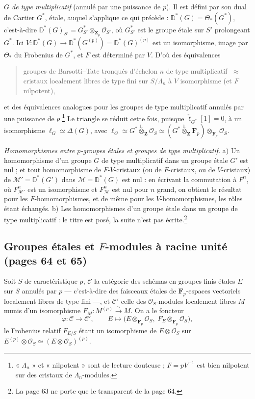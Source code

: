 \documentclass[11pt,a4paper]{article}
\begin{document}
\emph{$G$ de type multiplicatif} (annulé par une puissance de $p$). Il est
défini par son dual de Cartier $G^*$, étale, auquel s'applique ce qui
précède : $\mathbb{D}^*(G) = \Theta_*(G^*)$, c'est-à-dire
$\mathbb{D}^*(G)_{S'} = G^*_{S'} \otimes_{\mathbf{Z}_p} \mathcal{O}_{S'}$, où
$G^*_{S'}$ est le groupe étale sur $S'$ prolongeant $G^*$. Ici
$V : \mathbb{D}^*(G) \to \mathbb{D}^*(G^{(p)}) = \mathbb{D}^*(G)^{(p)}$ est un
isomorphisme, image par $\Theta_*$ du Frobenius de $G^*$, et $F$ est déterminé
par $V$. D'où des équivalences
\begin{quote}
groupes de Barsotti--Tate tronqués d'échelon $n$ de type multiplicatif
$\;\approx\;$ cristaux localement libres de type fini sur $S/\Lambda_n$ à $V$
isomorphisme (et $F$ nilpotent),
\end{quote}
et des équivalences analogues pour les groupes de type multiplicatif annulés
par une puissance de $p$.\footnote{« $\Lambda_n$ » et « nilpotent » sont de
lecture douteuse ; $F = pV^{-1}$ est bien nilpotent sur des cristaux de
$\Lambda_n$-modules.} Le triangle se réduit cette fois, puisque
$\check\ell_{G^*}[1] = 0$, à un isomorphisme $\ell_G \simeq \Delta(G)$, avec
$\ell_G \simeq G^* \overset{\mathbb{L}}{\otimes}_{\mathbf{Z}} \mathcal{O}_S
\simeq (G^* \overset{\mathbb{L}}{\otimes}_{\mathbf{Z}} \mathbf{F}_p)
\otimes_{\mathbf{F}_p} \mathcal{O}_S$.

\emph{Homomorphismes entre $p$-groupes étales et groupes de type
multiplicatif.} a) Un homomorphisme d'un groupe $G$ de type multiplicatif dans
un groupe étale $G'$ est nul ; et tout homomorphisme de $F$-$V$-cristaux (ou de
$F$-cristaux, ou de $V$-cristaux) de $\mathcal{M}' = \mathbb{D}^*(G')$ dans
$\mathcal{M} = \mathbb{D}^*(G)$ est nul : en écrivant la commutation à $F^n$,
où $F^n_{\mathcal{M}'}$ est un isomorphisme et $F^n_{\mathcal{M}}$ est nul pour
$n$ grand, on obtient le résultat pour les $F$-homomorphismes, et de même
pour les $V$-homomorphismes, les rôles étant échangés. b) Les homomorphismes
d'un groupe étale dans un groupe de type multiplicatif : le titre est posé, la
suite n'est pas écrite.\footnote{La page 63 ne porte que le transparent de la
page 64.}

\subsection*{Groupes étales et $F$-modules à racine unité (pages 64 et 65)}

Soit $S$ de caractéristique $p$, $\mathcal{C}$ la catégorie des schémas en
groupes finis étales $E$ sur $S$ annulés par $p$ — c'est-à-dire des faisceaux
étales de $\mathbf{F}_p$-espaces vectoriels localement libres de type fini —,
et $\mathcal{C}'$ celle des $\mathcal{O}_S$-modules localement libres $M$ munis
d'un isomorphisme $F_M : M^{(p)} \xrightarrow{\sim} M$. On a le foncteur
\[
  \varphi : \mathcal{C} \longrightarrow \mathcal{C}', \qquad
  E \longmapsto \bigl(E \otimes_{\mathbf{F}_p} \mathcal{O}_S,\;
  F_E \otimes_{\mathbf{F}_p} \mathcal{O}_S\bigr),
\]
le Frobenius relatif $F_{E/S}$ étant un isomorphisme de
$E \otimes \mathcal{O}_S$ sur $E^{(p)} \otimes \mathcal{O}_S \simeq
(E \otimes \mathcal{O}_S)^{(p)}$.
\end{document}
